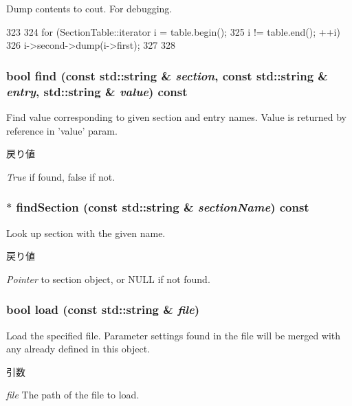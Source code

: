 Dump contents to cout. For debugging. 


\begin{DoxyCode}
323 {
324     for (SectionTable::iterator i = table.begin();
325          i != table.end(); ++i) {
326         i->second->dump(i->first);
327     }
328 }
\end{DoxyCode}
\hypertarget{classIniFile_a4463b62ff5381e1170a7a78c212acf3b}{
\subsubsection[{find}]{\setlength{\rightskip}{0pt plus 5cm}bool find (const std::string \& {\em section}, \/  const std::string \& {\em entry}, \/  std::string \& {\em value}) const}}
\label{classIniFile_a4463b62ff5381e1170a7a78c212acf3b}
Find value corresponding to given section and entry names. Value is returned by reference in 'value' param. 
\begin{DoxyRetVals}{戻り値}
\item[{\em True}]if found, false if not. \end{DoxyRetVals}
\hypertarget{classIniFile_a657c22f264ee81153a6d1a3c75ef0e76}{
\subsubsection[{findSection}]{$\ast$ findSection (const std::string \& {\em sectionName}) const}}
\label{classIniFile_a657c22f264ee81153a6d1a3c75ef0e76}
Look up section with the given name. 
\begin{DoxyRetVals}{戻り値}
\item[{\em Pointer}]to section object, or NULL if not found. \end{DoxyRetVals}
\hypertarget{classIniFile_a9c68305a6794dc960db947d68839b724}{
\subsubsection[{load}]{\setlength{\rightskip}{0pt plus 5cm}bool load (const std::string \& {\em file})}}
\label{classIniFile_a9c68305a6794dc960db947d68839b724}
Load the specified file. Parameter settings found in the file will be merged with any already defined in this object. 
\begin{DoxyParams}{引数}
\item[{\em file}]The path of the file to load. \end{DoxyParams}

